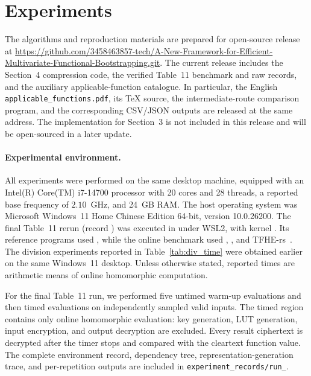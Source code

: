 
\section{Experiments}

The algorithms and reproduction materials are prepared for open-source release
at
\url{https://github.com/3458463857-tech/A-New-Framework-for-Efficient-Multivariate-Functional-Bootstrapping.git}.
The current release includes the Section~4 compression code, the verified
Table~11 benchmark and raw records, and the auxiliary applicable-function
catalogue. In particular, the English \texttt{applicable\_functions.pdf}, its
\TeX{} source, the intermediate-route comparison program, and the corresponding
CSV/JSON outputs are released at the same address. The implementation for
Section~3 is not included in this release and will be open-sourced in a later
update.

\paragraph{Experimental environment.}
All experiments were performed on the same desktop machine, equipped with an
Intel(R) Core(TM) i7-14700 processor with 20 cores and 28 threads, a reported
base frequency of $2.10$~GHz, and 24~GB RAM. The host operating system was
Microsoft Windows~11 Home Chinese Edition 64-bit, version 10.0.26200. The final
Table~11 rerun (record \texttt{\ExperimentRunId}) was executed in
\ExperimentRunnerOS{} under WSL2, with kernel \ExperimentKernel. Its reference
programs used \ExperimentPython, while the online benchmark used
\ExperimentRust, \ExperimentCargo, and TFHE-rs~\ExperimentTFHErs. The division
experiments reported in Table~\ref{tab:div_time} were obtained earlier on the
same Windows~11 desktop. Unless otherwise stated, reported times are arithmetic
means of online homomorphic computation.

For the final Table~11 run, we performed five untimed warm-up evaluations and
then \ExperimentRepetitions{} timed evaluations on independently sampled valid
inputs. The timed region contains only online homomorphic evaluation: key
generation, LUT generation, input encryption, and output decryption are
excluded. Every result ciphertext is decrypted after the timer stops and
compared with the cleartext function value. The complete environment record,
dependency tree, representation-generation trace, and per-repetition outputs
are included in
\texttt{experiment\_records/run\_\ExperimentRunId}.

